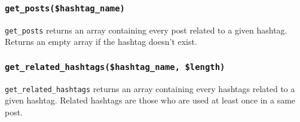 \documentclass[twoside,a4paper,12pt]{article}
\begin{document}
\subsubsection{\texttt{get\_posts(\$hashtag\_name)}}
\texttt{get\_posts} returns an array containing every post related to a given hashtag. Returns an empty array if the hashtag doesn't exist.

\subsubsection{\texttt{get\_related\_hashtags(\$hashtag\_name, \$length)}}
\texttt{get\_related\_hashtags} returns an array containing every hashtags related to a given hashtag. Related hashtags are those who are used at least once in a same post.
\end{document}
